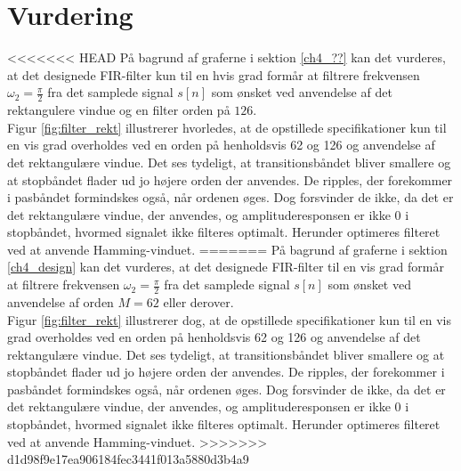 \section{Vurdering}
<<<<<<< HEAD
På bagrund af graferne i sektion \ref{ch4_??} kan det vurderes, at det designede FIR-filter kun til en hvis grad formår at filtrere frekvensen $\omega_2=\frac{\pi}{2}$ fra det samplede signal $s[n]$ som ønsket ved anvendelse af det rektangulere vindue og en filter orden på $126$. \\
Figur \ref{fig:filter_rekt} illustrerer hvorledes, at de opstillede specifikationer kun til en vis grad overholdes ved en orden på henholdsvis 62 og 126 og anvendelse af det rektangulære vindue. Det ses tydeligt, at transitionsbåndet bliver smallere og at stopbåndet flader ud jo højere orden der anvendes. De ripples, der forekommer i pasbåndet formindskes også, når ordenen øges. Dog forsvinder de ikke, da det er det rektangulære vindue, der anvendes, og amplituderesponsen er ikke 0 i stopbåndet,
hvormed signalet ikke filteres optimalt. Herunder optimeres filteret ved at anvende Hamming-vinduet.
=======
På bagrund af graferne i sektion \ref{ch4_design} kan det vurderes, at det designede FIR-filter til en vis grad formår at filtrere frekvensen $\omega_2=\frac{\pi}{2}$ fra det samplede signal $s[n]$ som ønsket ved anvendelse af orden $M=62$ eller derover. \\
Figur \ref{fig:filter_rekt} illustrerer dog, at de opstillede specifikationer kun til en vis grad overholdes ved en orden på henholdsvis 62 og 126 og anvendelse af det rektangulære vindue. Det ses tydeligt, at transitionsbåndet bliver smallere og at stopbåndet flader ud jo højere orden der anvendes. De ripples, der forekommer i pasbåndet formindskes også, når ordenen øges. Dog forsvinder de ikke, da det er det rektangulære vindue, der anvendes, og amplituderesponsen er ikke 0 i stopbåndet, hvormed signalet ikke filteres optimalt. Herunder optimeres filteret ved at anvende Hamming-vinduet.
>>>>>>> d1d98f9e17ea906184fec3441f013a5880d3b4a9

